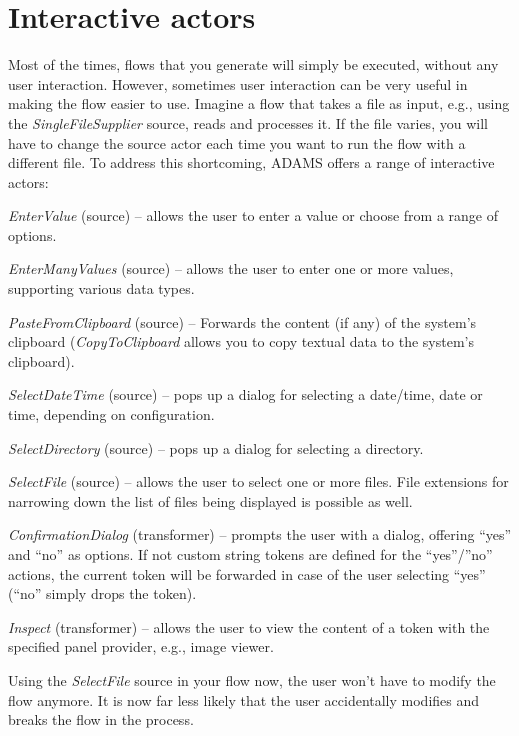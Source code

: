 \newpage
\section{Interactive actors}
\label{interactive_actors}
Most of the times, flows that you generate will simply be executed, without any
user interaction. However, sometimes user interaction can be very useful in
making the flow easier to use. Imagine a flow that takes a file as input, e.g.,
using the \textit{SingleFileSupplier} source, reads and processes it. If the
file varies, you will have to change the source actor each time you want to run
the flow with a different file. To address this shortcoming, ADAMS offers a
range of interactive actors:
\begin{tight_itemize}
	\item \textit{EnterValue} (source) -- allows the user to enter a value or
	choose from a range of options.
	\item \textit{EnterManyValues} (source) -- allows the user to enter one
	or more values, supporting various data types.
	\item \textit{PasteFromClipboard} (source) -- Forwards the content (if any) of
	the system's clipboard (\textit{CopyToClipboard} allows you to copy textual
	data to the system's clipboard).
	\item \textit{SelectDateTime} (source) -- pops up a dialog for selecting a
	date/time, date or time, depending on configuration.
	\item \textit{SelectDirectory} (source) -- pops up a dialog for selecting a
	directory.
	\item \textit{SelectFile} (source) -- allows the user to select one or more
	files. File extensions for narrowing down the list of files being displayed is
	possible as well.
	\item \textit{ConfirmationDialog} (transformer) -- prompts the user with a
	dialog, offering ``yes'' and ``no'' as options. If not custom string tokens are
	defined for the ``yes''/''no'' actions, the current token will be forwarded in
	case of the user selecting ``yes'' (``no'' simply drops the token).
	\item \textit{Inspect} (transformer) -- allows the user to view the content
	of a token with the specified panel provider, e.g., image viewer.
\end{tight_itemize}
Using the \textit{SelectFile} source in your flow now, the user won't have to
modify the flow anymore. It is now far less likely that the user accidentally
modifies and breaks the flow in the process.

